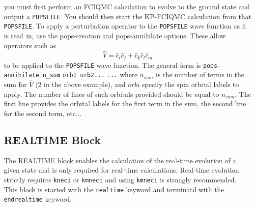 \documentclass[a4paper,notitlepage,dvipsnames]{scrreprt}
\let\code\lstinline
\begin{document}
    you must first perform an FCIQMC calculation to evolve to the ground state
    and output a \code{POPSFILE}. You should then start the KP-FCIQMC
    calculation from that \code{POPSFILE}. To apply a perturbation operator to
    the \code{POPSFILE} wave function as it is read in, use the pops-creation
    and pops-annihilate options. These allow operators such as
    \begin{equation}
        \hat{V} = \hat{c}_i \hat{c}_j + \hat{c}_k \hat{c}_l \hat{c}_m
    \end{equation}
    to be applied to the \code{POPSFILE} wave function. The general form is
    \code{pops-annihilate n_sum}
    \code{orb1 orb2...}
    \code{...}
    where $n_{sum}$ is the number of terms in the sum for $\hat{V}$ (2 in the
    above example), and $orbi$ specify the spin orbital labels to apply. The
    number of lines of such orbitals provided should be equal to $n_{sum}$. The
    first line provides the orbital labels for the first term in the sum, the
    second line for the second term, etc...

    \subsection{REALTIME Block}
    The REALTIME block enables the calculation of the real-time evolution of a
    given state and is only required for real-time calculations. Real-time
    evolution strictly requires \texttt{kneci} or \texttt{kmneci} and using
    \texttt{kmneci} is strongly recommended. This block is started with the
    \texttt{realtime} keyword and terminatd with the \texttt{endrealtime}
    keyword.
\end{document}
